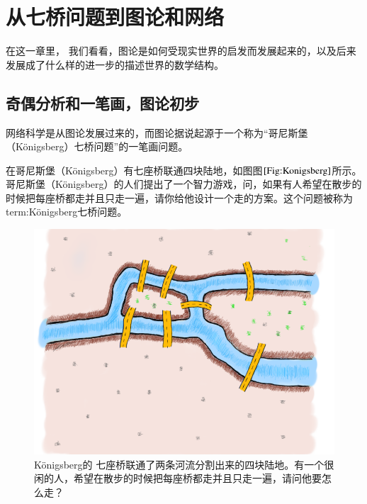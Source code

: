 \documentclass{ctexbook}
\newcommand{\ChapLabel}[1]{\label{#1}}
\newcommand{\FigLabel}[1]{\label{#1}}
\newcommand{\FigRef}[1]{图$\ref{#1}$}
\begin{document}
\chapter{从七桥问题到图论和网络}
\ChapLabel{Chap:Graph}
在这一章里， 我们看看，图论是如何受现实世界的启发而发展起来的，以及后来发展成了什么样的进一步的描述世界的数学结构。


\section{奇偶分析和一笔画，图论初步}
网络科学是从图论发展过来的，而图论据说起源于一个称为“哥尼斯堡（Königsberg）七桥问题”的一笔画问题。

在哥尼斯堡（Königsberg）有七座桥联通四块陆地，如图\FigRef{Fig:Konigsberg}所示。哥尼斯堡（Königsberg）的人们提出了一个智力游戏，问，如果有人希望在散步的时候把每座桥都走并且只走一遍，请你给他设计一个走的方案。这个问题被称为\gls{term:Königsberg七桥问题}。

\begin{figure}
\includegraphics[width=13cm]{figure/Konigsberg.png}
\caption[Königsberg 七桥问题]{Königsberg的 七座桥联通了两条河流分割出来的四块陆地。有一个很闲的人，希望在散步的时候把每座桥都走并且只走一遍，请问他要怎么走？}
\FigLabel{Fig:Konigsberg}
\end{figure}
\end{document}
